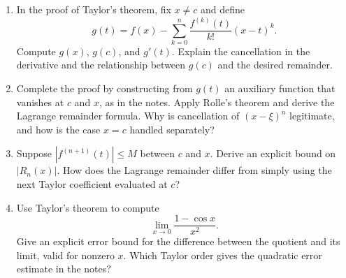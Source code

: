 \begin{enumerate}[resume]
  \item In the proof of Taylor's theorem, fix \(x\ne c\) and define
    \[
      g(t)=f(x)-\sum_{k=0}^{n}\frac{f^{(k)}(t)}{k!}(x-t)^k.
    \]
    Compute \(g(x)\), \(g(c)\), and \(g'(t)\).
    Explain the cancellation in the derivative and the relationship
    between \(g(c)\) and the desired remainder.

  \item Complete the proof by constructing from \(g(t)\) an auxiliary
    function that vanishes at \(c\) and \(x\), as in the notes.
    Apply Rolle's theorem and derive the Lagrange remainder formula.
    Why is cancellation of \((x-\xi)^n\) legitimate, and how is
    the case \(x=c\) handled separately?

  \item Suppose \(|f^{(n+1)}(t)|\leq M\) between \(c\) and \(x\).
    Derive an explicit bound on \(|R_n(x)|\).
    How does the Lagrange remainder differ from simply using the
    next Taylor coefficient evaluated at \(c\)?

  \item Use Taylor's theorem to compute
    \[
      \lim_{x\to0}\frac{1-\cos x}{x^2}.
    \]
    Give an explicit error bound for the difference between the
    quotient and its limit, valid for nonzero \(x\).
    Which Taylor order gives the quadratic error estimate in the notes?
\end{enumerate}
